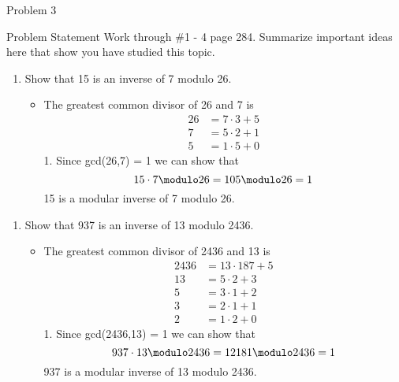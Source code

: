 \begin{problem}{Problem 3}
    \begin{statement}{Problem Statement}
        Work through \#1 - 4 page 284. Summarize important ideas here that show you have studied this topic.
    \end{statement}

    \begin{Highlight}[Solution - \# 1]
        \begin{enumerate}
            \item Show that 15 is an inverse of 7 modulo 26.
            \begin{itemize}
                \item The greatest common divisor of 26 and 7 is
                \begin{align*}
                    26 & = 7 \cdot 3 + 5 \\
                    7 & = 5 \cdot 2 + 1 \\
                    5 & = 1 \cdot 5 + 0
                \end{align*}
                1. Since gcd(26,7) = 1 we can show that
                \begin{equation*}
                    15 \cdot 7 \modulo 26 = 105 \modulo 26 = 1
                \end{equation*}
                15 is a modular inverse of 7 modulo 26.
            \end{itemize}
        \end{enumerate}
    \end{Highlight}

    \begin{Highlight}[Solution - \# 2]
        \begin{enumerate}[start = 2]
            \item Show that 937 is an inverse of 13 modulo 2436.
            \begin{itemize}
                \item The greatest common divisor of 2436 and 13 is
                \begin{align*}
                    2436 & = 13 \cdot 187 + 5 \\
                    13 & = 5 \cdot 2 + 3 \\
                    5 & = 3 \cdot 1 + 2 \\
                    3 & = 2 \cdot 1 + 1 \\
                    2 & = 1 \cdot 2 + 0
                \end{align*}
                1. Since gcd(2436,13) = 1 we can show that
                \begin{equation*}
                    937 \cdot 13 \modulo 2436 = 12181 \modulo 2436 = 1
                \end{equation*}
                937 is a modular inverse of 13 modulo 2436.
            \end{itemize}
        \end{enumerate}
    \end{Highlight}


\end{problem}
